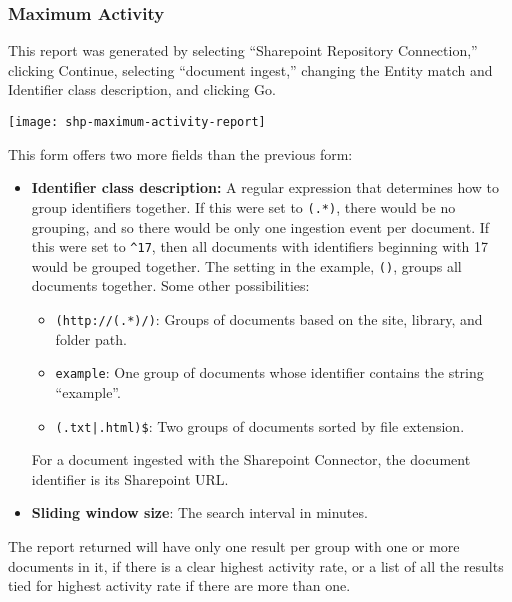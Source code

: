 \begin{changemargin}{1.5in}{0in}
\subsubsection{Maximum Activity}

This report was generated by selecting ``Sharepoint Repository
Connection,'' clicking Continue, selecting ``document ingest,''
changing the Entity match and Identifier class description, and
clicking Go.

\texttt{[image: shp-maximum-activity-report]}

This form offers two more fields than the previous form:

\begin{itemize}

\item \textbf{Identifier class description:} A regular expression
that determines how to group identifiers together. If this were set to
\texttt{(.*)}, there would be no grouping, and so there would be only one
ingestion event per document. If this were set to \texttt{\^{}17},
then all documents with identifiers beginning with 17 would be grouped
together. The setting in the example, \texttt{()}, groups all
documents together. Some other possibilities:

\begin{itemize}

\item \texttt{(http://(.*)/)}: Groups of documents based on the site,
library, and folder path.

\item \texttt{example}: One group of documents whose identifier contains
the string ``example''.

\item \texttt{(.txt|.html)\$}: Two groups of documents sorted by file
extension.

\end{itemize}

For a document ingested with the Sharepoint Connector, the document identifier
is its Sharepoint URL.

\item \textbf{Sliding window size}: The search interval in minutes.

\end{itemize}

The report returned will have only one result per group with one or more
documents in it, if there is a clear highest activity rate, or a list of
all the results tied for highest activity rate if there are more than one.


\end{changemargin}
